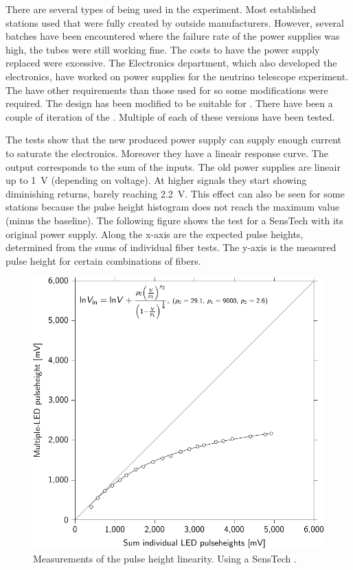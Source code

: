 There are several types of \pmt being used in the \hisparc experiment.
Most established stations used \pmts that were fully created by outside
manufacturers. However, several batches have been encountered where the
failure rate of the \pmt power supplies was high, the tubes were still
working fine. The costs to have the power supply replaced were
excessive. The \nikhef Electronics department, which also developed the
\hisparc electronics, have worked on \pmt power supplies for the \kmnet
neutrino telescope experiment. The \kmnet \pmts have other requirements
than those used for \hisparc so some modifications were required. The
\kmnet design has been modified to be suitable for \hisparc. There have
been a couple of iteration of the \hisparc \pmts. Multiple \pmts of each
of these versions have been tested.

The tests show that the new \nikhef produced \pmt power supply can
supply enough current to saturate the \hisparc electronics. Moreover
they have a lineair response curve. The output corresponds to the sum of
the inputs. The old power supplies are lineair up to \SI{1}{\volt}
(depending on voltage). At higher signals they start showing diminishing
returns, barely reaching \SI{2.2}{\volt}. This effect can also be seen
for some \hisparc stations because the pulse height histogram does not
reach the maximum \adc value (minus the baseline). The following figure
shows the test for a SensTech \pmt with its original power supply. Along
the x-axis are the expected pulse heights, determined from the sums of
individual fiber tests. The y-axis is the measured pulse height for
certain combinations of fibers.

\begin{figure}
    \centering
    \includegraphics{plots/calibration/linearity_senstech_ph}
    \caption{Measurements of the pulse height linearity. Using a
             SensTech \pmt.}
    \label{fig:linearity_senstech_ph}
\end{figure}

